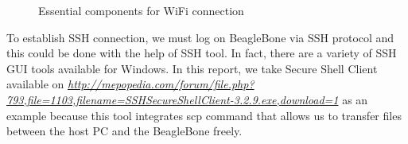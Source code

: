 \documentclass[12pt,journal,draftclsnofoot,onecolumn]{IEEEtran}
\begin{document}
\begin{figure}[htb]
	\centering
     \caption{Essential components for WiFi connection}
     \end{figure}  
  
To establish SSH connection, we must log on BeagleBone via SSH protocol and this could be done with the help of SSH tool. In fact, there are a variety of SSH GUI tools available for Windows. In this report, we take Secure Shell Client available on \textcolor{blue}{\textit{\url{http://mepopedia.com/forum/file.php?793,file=1103,filename=SSHSecureShellClient-3.2.9.exe,download=1}}}  as an example because this tool integrates scp command that allows us to transfer files between the host PC and the BeagleBone freely.
\end{document}
